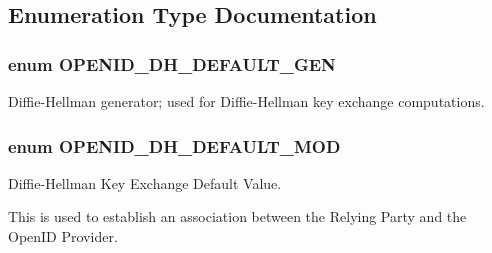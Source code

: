 \subsection{Enumeration Type Documentation}
\hypertarget{openid_8inc_a37fc6c436be5dbdc8cc896a37bb2ef5b}{
\subsubsection[{OPENID\_\-DH\_\-DEFAULT\_\-GEN}]{\setlength{\rightskip}{0pt plus 5cm}enum {\bf OPENID\_\-DH\_\-DEFAULT\_\-GEN}}}
\label{openid_8inc_a37fc6c436be5dbdc8cc896a37bb2ef5b}
Diffie-\/Hellman generator; used for Diffie-\/Hellman key exchange computations. \hypertarget{openid_8inc_a6959f46b7a0a95194027313b08ff9b8f}{
\subsubsection[{OPENID\_\-DH\_\-DEFAULT\_\-MOD}]{\setlength{\rightskip}{0pt plus 5cm}enum {\bf OPENID\_\-DH\_\-DEFAULT\_\-MOD}}}
\label{openid_8inc_a6959f46b7a0a95194027313b08ff9b8f}
Diffie-\/Hellman Key Exchange Default Value.

This is used to establish an association between the Relying Party and the OpenID Provider.


